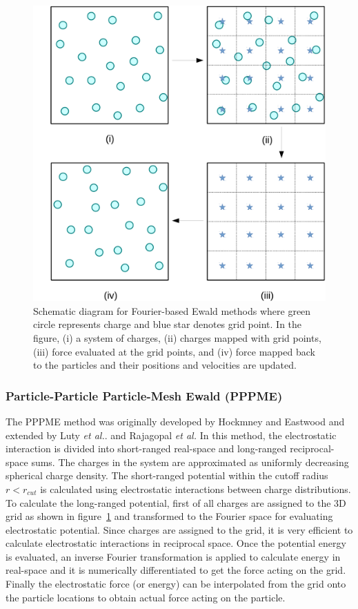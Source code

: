 \begin{figure}[tpb]
  \begin{center}
    \centerline{\includegraphics[width = \linewidth]{PM_method.pdf}}
    \caption{Schematic diagram for Fourier-based Ewald methods where green circle represents charge and blue star denotes grid point. In the figure, (i) a system of charges, (ii) charges mapped with grid points, (iii) force evaluated at the grid points, and (iv) force mapped back to the particles and their positions and velocities are updated. }
    \label{fig:PPPME}
  \end{center}
\end{figure}
\subsubsection{Particle-Particle Particle-Mesh Ewald (PPPME)}
\label{subsec:PPPME}
The PPPME method was originally developed by Hockmney and Eastwood \cite{Hockney88} and extended  by Luty \textit{et al.}.\cite{Luty94} and Rajagopal \textit{et al.} \cite{Rajagopal94} In this method, the electrostatic interaction is divided into short-ranged real-space and long-ranged reciprocal-space sums. The charges in the system are approximated as uniformly decreasing spherical charge density. The short-ranged potential within the cutoff radius $r < r_{cut}$ is calculated using electrostatic interactions between charge distributions. To calculate the long-ranged potential, first of all charges are assigned to the 3D grid as shown in figure~\ref{fig:PPPME} and transformed to the Fourier space for evaluating electrostatic potential. Since charges are assigned to the grid, it is very efficient to calculate electrostatic interactions in reciprocal space. Once the potential energy is evaluated, an inverse Fourier transformation is applied to calculate energy in real-space and it is numerically differentiated to get the force acting on the grid. Finally the electrostatic force (or energy) can be interpolated from the grid onto the particle locations to obtain actual force acting on the particle.

